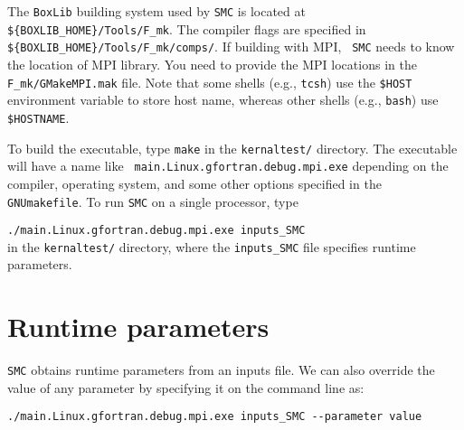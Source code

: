 \documentclass[11pt,letterpaper]{article}
\begin{document}
The {\tt BoxLib} building system used by {\tt SMC} is located at {\tt
  \$\{BOXLIB\_HOME\}/Tools/F\_mk}.  The compiler flags are specified in {\tt
  \$\{BOXLIB\_HOME\}/Tools/F\_mk/comps/}.  If building with MPI, {\tt
  SMC} needs to know the location of MPI library.  You need to provide
the MPI locations in the {\tt F\_mk/GMakeMPI.mak} file.  Note that
some shells (e.g., {\tt tcsh}) use the {\tt \$HOST} environment
variable to store host name, whereas other shells (e.g., {\tt bash})
use {\tt \$HOSTNAME}.

To build the executable, type {\tt make} in the {\tt kernaltest/}
directory.  The executable will have a name like {\tt
  main.Linux.gfortran.debug.mpi.exe} depending on the compiler,
operating system, and some other options specified in the {\tt
  GNUmakefile}.  To run {\tt SMC} on a single processor, type
\vspace{5pt}

\verb|./main.Linux.gfortran.debug.mpi.exe inputs_SMC|\vspace{5pt}\\
in the {\tt kernaltest/} directory, where the {\tt inputs\_SMC} file
specifies runtime parameters. 

\section{Runtime parameters}

{\tt SMC} obtains runtime parameters from an inputs file.  We can also
override the value of any parameter by specifying it on the
command line as:\vspace{5pt}

\verb|./main.Linux.gfortran.debug.mpi.exe inputs_SMC --parameter value|\\
\end{document}
